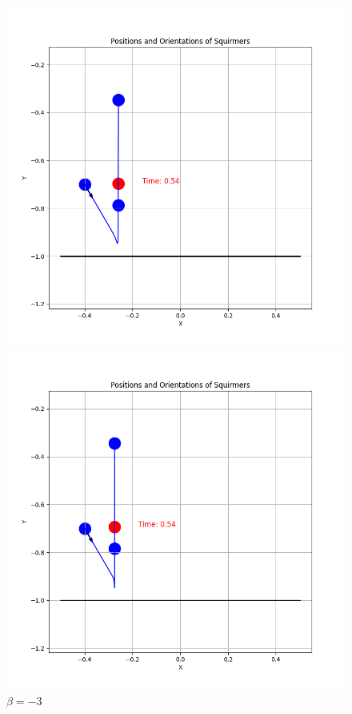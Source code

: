 \documentclass{article}
\begin{document}
\begin{figure}[H]
    \centering
    \begin{minipage}{0.49\textwidth}
        \includegraphics[width=1.1\textwidth]{graphs/simulations/border/betam1_5/mpi_3.png}
        \caption{\footnotesize $\beta = -1.5$}
    \end{minipage}\hfill
    \begin{minipage}{0.49\textwidth}
        \includegraphics[width=1.1\textwidth]{graphs/simulations/border/betam3/mpi_3.png}
        \caption{\footnotesize $\beta = -3$}
    \end{minipage}
\end{figure}
\end{document}
